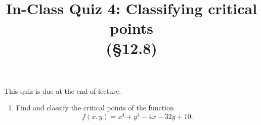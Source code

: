 \documentclass[]{article}
\title{\vspace{-3.5pc} 
	\flushleft \bf \Large In-Class Quiz 4: Classifying critical points \\ (\S 12.8)}
\date{}
\begin{document}
\maketitle

\vspace{-3pc}
 This quiz is due at the end of lecture.  

\noindent\hrulefill

\begin{enumerate}



\item %
Find and classify the critical points of the function 
\[
f(x,y)=x^4+y^4-4x-32y+10.
\] 

\end{enumerate}
\end{document}
